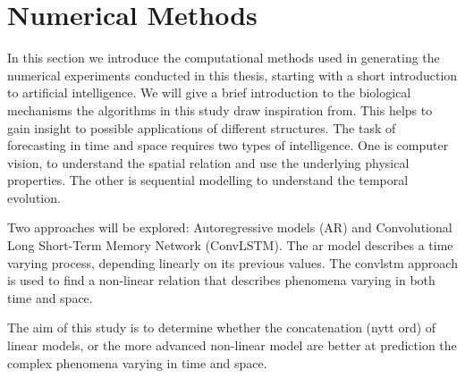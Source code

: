 \setcounter{chapter}{2}
\chapter{Numerical Methods} \label{ch:num_methods}
In this section we introduce the computational methods used in generating the numerical experiments conducted in this thesis, starting with a short introduction to artificial intelligence. We will give a brief introduction to the biological mechanisms the algorithms in this study draw inspiration from. This helps to gain insight to possible applications of different structures.
The task of forecasting in time and space requires two types of intelligence. One is computer vision, to understand the spatial relation and use the underlying physical properties. The other is sequential modelling to understand the temporal evolution.

Two approaches will be explored: Autoregressive models (AR) and Convolutional Long Short-Term Memory Network (ConvLSTM). The \acrshort{ar} model describes a time varying process, depending linearly on its previous values. The \acrshort{convlstm} approach is used to find a non-linear relation that describes phenomena varying in both time and space.

The aim of this study is to determine whether the concatenation (nytt ord) of linear models, or the more advanced non-linear model are better at prediction the complex phenomena varying in time and space.

